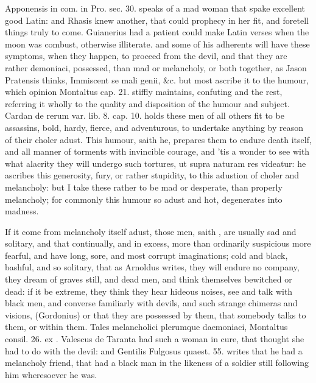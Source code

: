 {Apponensis in com. in Pro. sec. 30. speaks of a mad woman that spake
excellent good Latin: and Rhasis knew another, that could prophecy in
her fit, and foretell things truly to come. Guianerius had a
patient could make Latin verses when the moon was combust, otherwise
illiterate. \Avicenna{} and some of his adherents will have these
symptoms, when they happen, to proceed from the devil, and that they
are rather demoniaci, possessed, than mad or melancholy, or both
together, as Jason Pratensis thinks, Immiscent se mali genii, \&c. but
most ascribe it to the humour, which opinion Montaltus cap. 21. stiffly
maintains, confuting \Avicenna{} and the rest, referring it wholly to the
quality and disposition of the humour and subject. Cardan de rerum var.
lib. 8. cap. 10. holds these men of all others fit to be assassins,
bold, hardy, fierce, and adventurous, to undertake anything by reason
of their choler adust. This humour, saith he, prepares them to
endure death itself, and all manner of torments with invincible
courage, and 'tis a wonder to see with what alacrity they will undergo
such tortures, ut supra naturam res videatur: he ascribes this
generosity, fury, or rather stupidity, to this adustion of choler and
melancholy: but I take these rather to be mad or desperate, than
properly melancholy; for commonly this humour so adust and hot,
degenerates into madness.

If it come from melancholy itself adust, those men, saith \Avicenna{},
 are usually sad and solitary, and that continually, and in
excess, more than ordinarily suspicious more fearful, and have long,
sore, and most corrupt imaginations; cold and black, bashful, and so
solitary, that as Arnoldus writes, they will endure no company,
they dream of graves still, and dead men, and think themselves
bewitched or dead: if it be extreme, they think they hear hideous
noises, see and talk with black men, and converse familiarly with
devils, and such strange chimeras and visions, (Gordonius) or that they
are possessed by them, that somebody talks to them, or within them.
Tales melancholici plerumque daemoniaci, Montaltus consil. 26. ex
\Avicenna{}. Valescus de Taranta had such a woman in cure, that
thought she had to do with the devil: and Gentilis Fulgosus quaest. 55.
writes that he had a melancholy friend, that  had a black man in
the likeness of a soldier still following him wheresoever he was.

}
